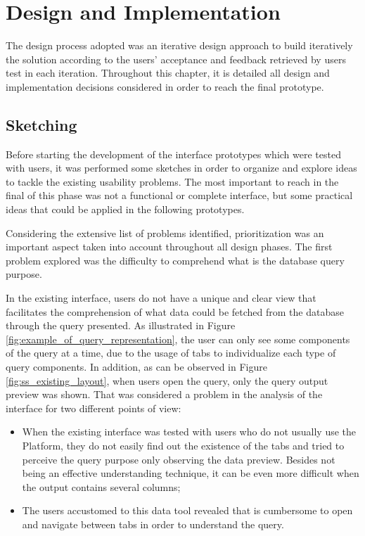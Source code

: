 

\chapter{Design and Implementation}
\label{cha:design_and_implementation}

The design process adopted was an iterative design approach to build iteratively the solution according to the users' acceptance and feedback retrieved by users test in each iteration. Throughout this chapter, it is detailed all design and implementation decisions considered in order to reach the final prototype.

\section{Sketching}
\label{sec:sketching}

Before starting the development of the interface prototypes which were tested with users, it was performed some sketches in order to organize and explore ideas to tackle the existing usability problems. The most important to reach in the final of this phase was not a functional or complete interface, but some practical ideas that could be applied in the following prototypes.

Considering the extensive list of problems identified, prioritization was an important aspect taken into account throughout all design phases. The first problem explored was the difficulty to comprehend what is the database query purpose.

In the existing interface, users do not have a unique and clear view that facilitates the comprehension of what data could be fetched from the database through the query presented. As illustrated in Figure \ref{fig:example_of_query_representation}, the user can only see some components of the query at a time, due to the usage of tabs to individualize each type of query components. In addition, as can be observed in Figure \ref{fig:ss_existing_layout}, when users open the query, only the query output preview was shown. That was considered a problem in the analysis of the interface for two different points of view:

\begin{itemize}
    \item When the existing interface was tested with users who do not usually use the Platform, they do not easily find out the existence of the tabs and tried to perceive the query purpose only observing the data preview. Besides not being an effective understanding technique, it can be even more difficult when the output contains several columns;
    \item The users accustomed to this data tool revealed that is cumbersome to open and navigate between tabs in order to understand the query.
\end{itemize}

